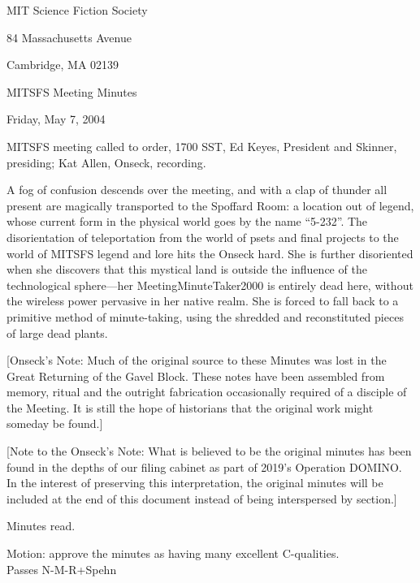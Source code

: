 \documentclass[10pt]{article}
\begin{document}
\begin{center}

MIT Science Fiction Society 

84 Massachusetts Avenue

Cambridge, MA 02139

\vspace{12pt}

MITSFS Meeting Minutes 

Friday, May 7, 2004

\end{center}
 
\vspace{18pt}

\setlength{\parskip}{6pt}

\noindent
MITSFS meeting called to order, 1700 SST, Ed Keyes, President and
Skinner, presiding; Kat Allen,  Onseck, recording.

A fog of confusion descends over the meeting, and with a clap of
thunder all present are magically transported to the Spoffard Room: a
location out of legend, whose current form in the physical world goes
by the name ``5-232''.  The disorientation of teleportation from the
world of psets and final projects to the world of MITSFS legend and
lore hits the Onseck hard.  She is further disoriented when she
discovers that this mystical land is outside the influence of the
technological sphere---her MeetingMinuteTaker2000 is entirely dead
here, without the wireless power pervasive in her native realm.  She
is forced to fall back to a primitive method of minute-taking, using
the shredded and reconstituted pieces of large dead plants.

[Onseck's Note: Much of the original source to these Minutes
  was lost in the Great Returning of the Gavel Block.  These notes
  have been assembled from memory, ritual and the outright fabrication
  occasionally required of a disciple of the Meeting.  It is still the
  hope of historians that the original work might someday be found.]
  
[Note to the Onseck's Note: What is believed to be the original minutes has been found in the depths of our filing cabinet as part of 2019's Operation DOMINO. In the interest of preserving this interpretation, the original minutes will be included at the end of this document instead of being interspersed by section.]

Minutes read.


Motion: approve the minutes as having many excellent C-qualities.\\
Passes N-M-R+Spehn
\end{document}
